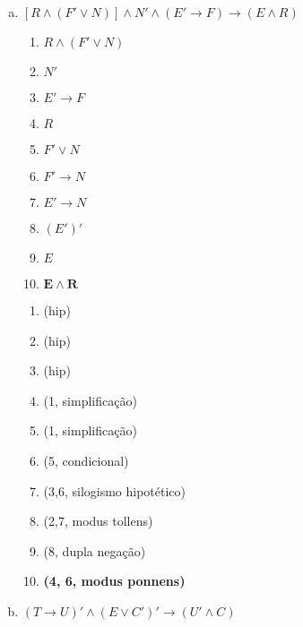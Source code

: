 \documentclass[a4paper, 12pt, addpoints]{exam}
\begin{document}
\begin{questions}
\begin{resp}
\begin{enumerate}[a)]
\begin{multicols}{2}
      \end{multicols}
      
      \item $[R \land (F' \lor N)] \land N' \land (E'\rightarrow F) \rightarrow (E \land R)$ \\
      \begin{multicols}{2}

        \begin{enumerate}[1.]
          \item $R \land (F' \lor N)$
          \item $N'$
          \item $E'\rightarrow F$
          \item $R$
          \item $F' \lor N$
          \item $F' \rightarrow N$
          \item $E' \rightarrow N$
          \item $(E')'$
          \item $E$
          \item $\boldsymbol{E \land R}$
        \end{enumerate}
        
        \columnbreak

        \begin{enumerate}[\ding{32}]
          \item (hip)
          \item (hip)
          \item (hip)
          \item (1, simplificação)
          \item (1, simplificação)
          \item (5, condicional)
          \item (3,6, silogismo hipotético)
          \item (2,7, modus tollens)
          \item (8, dupla negação)
          \item \textbf{(4, 6, modus ponnens)}
        \end{enumerate}

      \end{multicols}
      
      \item $(T \rightarrow U)' \land (E \lor C')' \rightarrow (U' \land C)$ \\
      \begin{multicols}{2}


\end{multicols}
\end{enumerate}
\end{resp}
\end{questions}
\end{document}
